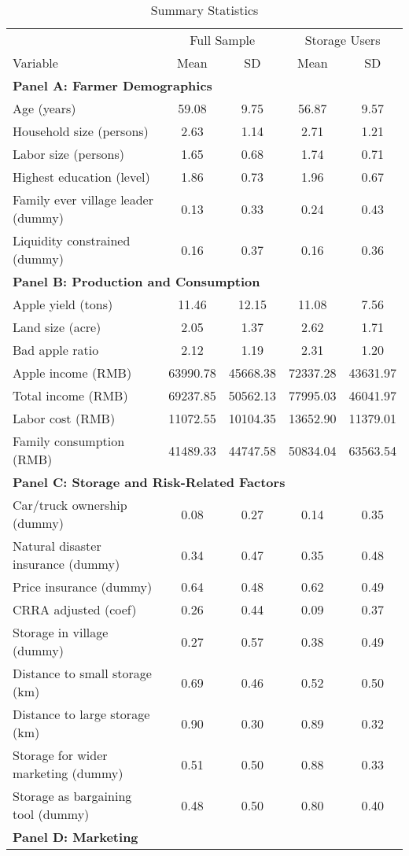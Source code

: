 \begin{table}[htbp]
\centering
\caption{Summary Statistics}
\label{tab: summary statistics}
\begin{tabular}{lcccc}
\hline
& \multicolumn{2}{c}{Full Sample} & \multicolumn{2}{c}{Storage Users} \\
\cline{2-3} \cline{4-5}
Variable & Mean & SD & Mean & SD \\
\hline
\multicolumn{5}{l}{\textbf{Panel A: Farmer Demographics}} \\

Age (years) & 59.08 & 9.75 & 56.87 & 9.57 \\ 
Household size (persons) & 2.63 & 1.14 & 2.71 & 1.21 \\ 
Labor size (persons) & 1.65 & 0.68 & 1.74 & 0.71 \\ 
Highest education (level) & 1.86 & 0.73 & 1.96 & 0.67 \\ 
Family ever village leader (dummy) & 0.13 & 0.33 & 0.24 & 0.43 \\ 
Liquidity constrained (dummy) & 0.16 & 0.37 & 0.16 & 0.36 \\ 
\hline
\multicolumn{5}{l}{\textbf{Panel B: Production and Consumption}} \\

Apple yield (tons) & 11.46 & 12.15 & 11.08 & 7.56 \\ 
Land size (acre) & 2.05 & 1.37 & 2.62 & 1.71 \\ 
Bad apple ratio & 2.12 & 1.19 & 2.31 & 1.20 \\ 
Apple income (RMB) & 63990.78 & 45668.38 & 72337.28 & 43631.97 \\ 
Total income (RMB) & 69237.85 & 50562.13 & 77995.03 & 46041.97 \\ 
Labor cost (RMB) & 11072.55 & 10104.35 & 13652.90 & 11379.01 \\ 
Family consumption (RMB) & 41489.33 & 44747.58 & 50834.04 & 63563.54 \\ 
\hline
\multicolumn{5}{l}{\textbf{Panel C: Storage and Risk-Related Factors}} \\

Car/truck ownership (dummy) & 0.08 & 0.27 & 0.14 & 0.35 \\ 
Natural disaster insurance (dummy) & 0.34 & 0.47 & 0.35 & 0.48 \\ 
Price insurance (dummy) & 0.64 & 0.48 & 0.62 & 0.49 \\ 
CRRA adjusted (coef) & 0.26 & 0.44 & 0.09 & 0.37 \\ 
Storage in village (dummy) & 0.27 & 0.57 & 0.38 & 0.49 \\ 
Distance to small storage (km) & 0.69 & 0.46 & 0.52 & 0.50 \\ 
Distance to large storage (km) & 0.90 & 0.30 & 0.89 & 0.32 \\ 
Storage for wider marketing (dummy) & 0.51 & 0.50 & 0.88 & 0.33 \\ 
Storage as bargaining tool (dummy) & 0.48 & 0.50 & 0.80 & 0.40 \\ 
\hline
\multicolumn{5}{l}{\textbf{Panel D: Marketing}} \\


\end{tabular}
\end{table}
